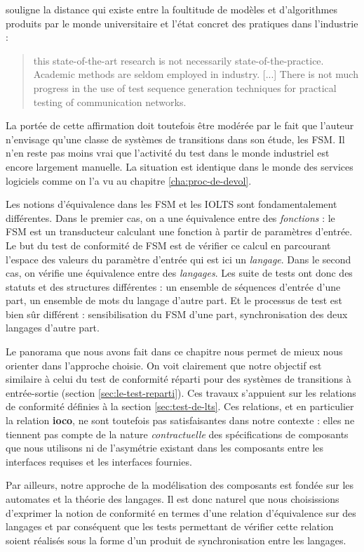 \cite{lai-prototest-survey} souligne la distance qui
existe entre la foultitude de mod\`eles et d'algorithmes produits par
le monde universitaire et l'\'etat concret des pratiques dans
l'industrie :
\begin{quote}
    \og [...] this state-of-the-art research is not necessarily
    state-of-the-practice. Academic methods are seldom employed in
    industry. [...] There is not much progress in the use of test
    sequence generation techniques for practical testing of
    communication networks. \fg
\end{quote}
La port\'ee  de cette affirmation doit toutefois \^etre
mod\'er\'ee par le fait que l'auteur n'envisage qu'une classe de
syst\`emes de transitions dans son \'etude, les \textsf{FSM}. Il n'en reste
pas moins vrai que l'activit\'e du test dans le monde industriel est
encore largement \og manuelle\fg.
La situation est identique dans le monde des services logiciels comme on l'a vu au chapitre
\ref{cha:proc-de-devol}. 

Les notions d'\'equivalence dans les FSM et les IOLTS sont
fondamentalement diff\'erentes. Dans le premier cas, on a une
\'equivalence entre des \emph{fonctions} : le \textsf{FSM} est un
transducteur calculant une fonction \`a partir de param\`etres
d'entr\'ee. Le but du test de conformit\'e de \textsf{FSM} est de
v\'erifier ce calcul en parcourant l'espace des valeurs du
param\`etre d'entr\'ee qui est ici un \emph{langage}. Dans le second
cas, on v\'erifie une \'equivalence entre des \emph{langages}. Les
suite de tests ont donc des statuts et des structures diff\'erentes :
un ensemble de s\'equences d'entr\'ee d'une part, un ensemble de
mots du langage d'autre part. Et le processus de test est bien s\^ur
diff\'erent : sensibilisation du FSM d'une part, synchronisation des
deux langages d'autre part.

Le panorama que nous avons fait dans ce chapitre nous permet de mieux
nous orienter dans l'approche choisie. On voit clairement que notre
objectif est similaire \`a celui du test de conformit\'e
r\'eparti pour des syst\`emes de transitions \`a entr\'ee-sortie (section
\ref{sec:le-test-reparti}). Ces travaux s'appuient sur les relations de conformit\'e
d\'efinies \`a la section \ref{sec:test-de-lts}. Ces
relations,  et en particulier la relation
\textbf{ioco}, ne sont toutefois pas satisfaisantes dans notre
contexte : elles ne tiennent pas compte de
la nature \emph{contractuelle} des sp\'ecifications de composants que
nous utilisons ni de l'asym\'etrie existant dans les
composants entre les interfaces requises et les interfaces fournies. 
 
Par ailleurs, notre approche de la mod\'elisation des composants est fond\'ee sur les automates et
la th\'eorie des langages. Il est donc naturel que nous choisissions
d'exprimer la notion de conformit\'e en termes d'une relation
d'\'equivalence sur des langages et par cons\'equent que les tests
permettant de v\'erifier cette relation soient r\'ealis\'es sous la
forme d'un produit de synchronisation entre les langages.


